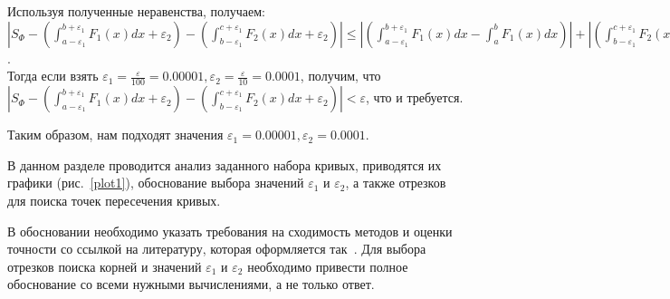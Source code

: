 \documentclass[a4paper,12pt,titlepage,finall]{article}
\begin{document}
Используя полученные неравенства, получаем:\\
$\left|S_{\Phi} - (\int_{a-\varepsilon_1}^{b+\varepsilon_1}F_{1}(x)dx + \varepsilon_2) - (\int_{b-\varepsilon_1}^{c+\varepsilon_1}F_{2}(x)dx+\varepsilon_2)\right| \le 
\left|(\int_{a-\varepsilon_1}^{b+\varepsilon_1}F_{1}(x)dx - \int_{a}^{b}F_{1}(x)dx)\right| + \left|(\int_{b-\varepsilon_1}^{c+\varepsilon_1}F_{2}(x)dx - \int_{b}^{c}F_{2}(x)dx)\right| + 2\varepsilon_2 = \left|\int_{a-\varepsilon_1}^{a}F_{1}(x)dx\right| + \left|\int_{b}^{b+\varepsilon_1}F_{1}(x)dx\right| + \left|\int_{b-\varepsilon_1}^{b}F_{2}(x)dx\right| + \left|\int_{c}^{c+\varepsilon_1}F_{2}(x)dx\right| + 2\varepsilon_1 < 
(a-(a-\varepsilon_1))\underset{x \in \left[ a-\varepsilon_1, a \right]}{max}F_1(x) +
((b+\varepsilon_1)-b)\underset{x \in \left[ b, b+\varepsilon_1 \right]}{max}F_1(x) +
(b-(b-\varepsilon_1))\underset{x \in \left[ b-\varepsilon_1, b \right]}{max}F_2(x) +
((c+\varepsilon_1)-c)\underset{x \in \left[ c, c+\varepsilon_1 \right]}{max}F_2(x) +
2\varepsilon_2 < 4\varepsilon_1\cdot10 + 2\varepsilon_2 = 40\varepsilon_1 + 2\varepsilon_2$.\\
Тогда если взять $\varepsilon_1 = \frac{\varepsilon}{100} = 0.00001, \varepsilon_2 = \frac{\varepsilon}{10} = 0.0001$, получим, что\\ $\left|S_{\Phi} - (\int_{a-\varepsilon_1}^{b+\varepsilon_1}F_{1}(x)dx + \varepsilon_2) - (\int_{b-\varepsilon_1}^{c+\varepsilon_1}F_{2}(x)dx+\varepsilon_2)\right| < \varepsilon$, что и требуется.
\par
Таким образом, нам подходят значения $\varepsilon_1 = 0.00001, \varepsilon_2 = 0.0001$.\\
\par

В данном разделе проводится анализ заданного набора кривых, приводятся их графики (рис.~\ref{plot1}),
обоснование выбора значений $\varepsilon_1$ и $\varepsilon_2$, а также отрезков для поиска точек
пересечения кривых.

В обосновании необходимо указать требования на сходимость методов и оценки точности со ссылкой на
литературу, которая оформляется так~\cite{math}. Для выбора отрезков поиска корней и значений $\varepsilon_1$ и $\varepsilon_2$ необходимо
привести полное обоснование со всеми нужными вычислениями, а не только ответ.
\end{document}
